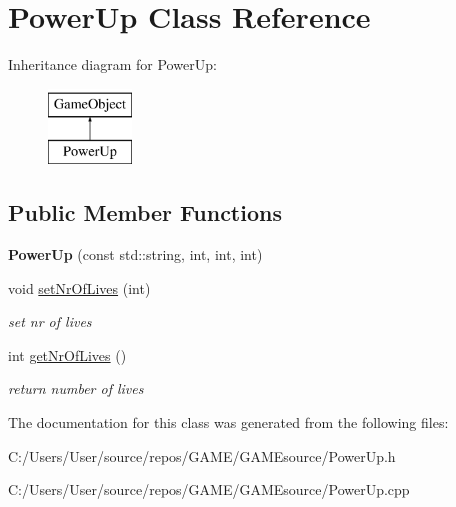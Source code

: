 \hypertarget{class_power_up}{}\section{Power\+Up Class Reference}
\label{class_power_up}
Inheritance diagram for Power\+Up\+:\begin{figure}[H]
\begin{center}
\leavevmode
\includegraphics[height=2.000000cm]{class_power_up}
\end{center}
\end{figure}
\subsection*{Public Member Functions}
\begin{DoxyCompactItemize}
\item 
\mbox{\label{class_power_up_a1146d214489e9f66e80b0d9905ce6aef}} 
{\bfseries Power\+Up} (const std\+::string, int, int, int)
\item 
\mbox{\label{class_power_up_a0358e4edc1c61e26e0c7018b3ebef118}} 
void \mbox{\hyperlink{class_power_up_a0358e4edc1c61e26e0c7018b3ebef118}{set\+Nr\+Of\+Lives}} (int)
\begin{DoxyCompactList}\small\item\em set nr of lives \end{DoxyCompactList}\item 
\mbox{\label{class_power_up_a20b1f2fa6a06891bdac68103f16816f1}} 
int \mbox{\hyperlink{class_power_up_a20b1f2fa6a06891bdac68103f16816f1}{get\+Nr\+Of\+Lives}} ()
\begin{DoxyCompactList}\small\item\em return number of lives \end{DoxyCompactList}\end{DoxyCompactItemize}


The documentation for this class was generated from the following files\+:\begin{DoxyCompactItemize}
\item 
C\+:/\+Users/\+User/source/repos/\+G\+A\+M\+E/\+G\+A\+M\+Esource/Power\+Up.\+h\item 
C\+:/\+Users/\+User/source/repos/\+G\+A\+M\+E/\+G\+A\+M\+Esource/Power\+Up.\+cpp\end{DoxyCompactItemize}
